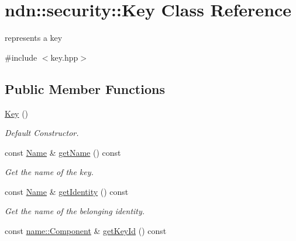 \hypertarget{classndn_1_1security_1_1Key}{}\section{ndn\+:\+:security\+:\+:Key Class Reference}
\label{classndn_1_1security_1_1Key}


represents a key  




{\ttfamily \#include $<$key.\+hpp$>$}

\subsection*{Public Member Functions}
\begin{DoxyCompactItemize}
\item 
\hyperlink{classndn_1_1security_1_1Key_a28037d60a70b8fe6110e9bbc4c67bd35}{Key} ()
\begin{DoxyCompactList}\small\item\em Default Constructor. \end{DoxyCompactList}\item 
const \hyperlink{classndn_1_1Name}{Name} \& \hyperlink{classndn_1_1security_1_1Key_abc89b5d69b84f4328e39390c980d6e87}{get\+Name} () const\hypertarget{classndn_1_1security_1_1Key_abc89b5d69b84f4328e39390c980d6e87}{}\label{classndn_1_1security_1_1Key_abc89b5d69b84f4328e39390c980d6e87}

\begin{DoxyCompactList}\small\item\em Get the name of the key. \end{DoxyCompactList}\item 
const \hyperlink{classndn_1_1Name}{Name} \& \hyperlink{classndn_1_1security_1_1Key_ac34b967ab510fdc50954d2088e87edae}{get\+Identity} () const\hypertarget{classndn_1_1security_1_1Key_ac34b967ab510fdc50954d2088e87edae}{}\label{classndn_1_1security_1_1Key_ac34b967ab510fdc50954d2088e87edae}

\begin{DoxyCompactList}\small\item\em Get the name of the belonging identity. \end{DoxyCompactList}\item 
const \hyperlink{classndn_1_1name_1_1Component}{name\+::\+Component} \& \hyperlink{classndn_1_1security_1_1Key_a69d411b8acca98d8eaf6bb95ffc0f464}{get\+Key\+Id} () const\hypertarget{classndn_1_1security_1_1Key_a69d411b8acca98d8eaf6bb95ffc0f464}{}\label{classndn_1_1security_1_1Key_a69d411b8acca98d8eaf6bb95ffc0f464}


\end{DoxyCompactItemize}
